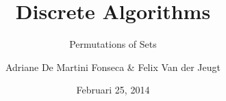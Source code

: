 \documentclass{beamer}
\title[DA - Permutations]{Discrete Algorithms}
\subtitle{Permutations of Sets}
\author{Adriane De Martini Fonseca \& Felix Van der Jeugt}
\date{Februari 25, 2014}
\begin{document}
\begin{frame}
    \titlepage
\end{frame}
\end{document}
